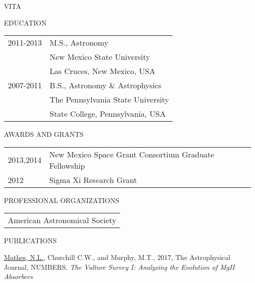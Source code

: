 \begin{center}
 VITA
\end{center}

\medskip

\begin{center}
 EDUCATION
\end{center}


\begin{flushleft}
\begin{tabular}{ll}
2011-2013 &  M.S., Astronomy\\
 & New Mexico State University\\
 & Las  Cruces, New Mexico, USA\\
2007-2011 &  B.S., Astronomy \& Astrophysics\\
 & The Pennsylvania State University\\
 & State College, Pennsylvania, USA
\end{tabular}
\end{flushleft}

\medskip

\begin{center}
AWARDS AND GRANTS
\end{center}
\begin{flushleft}
\begin{tabular}{ll}
2013,2014 & New Mexico Space Grant Consortium Graduate Fellowship\\
2012 & Sigma Xi Research Grant
\end{tabular}
\end{flushleft}

\medskip

\begin{center}
PROFESSIONAL ORGANIZATIONS
\end{center}
\begin{flushleft}
\begin{tabular}{l}
American Astronomical Society
\end{tabular}
\end{flushleft}

\medskip

\singlespace

\begin{center}
PUBLICATIONS
\end{center}

\hangindent=0.5in \noindent \underline{Mathes, N.L.}, Churchill C.W., and Murphy, M.T., 2017, The Astrophysical Journal, NUMBERS. \textit{The Vulture Survey I: Analyzing the Evolution of MgII Absorbers}

